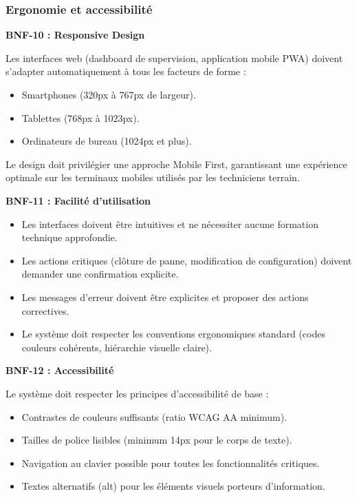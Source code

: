 \subsubsection{Ergonomie et accessibilité}

\textbf{BNF-10 : Responsive Design}

Les interfaces web (dashboard de supervision, application mobile PWA) doivent s'adapter automatiquement à tous les facteurs de forme :

\begin{itemize}
    \item Smartphones (320px à 767px de largeur).
    \item Tablettes (768px à 1023px).
    \item Ordinateurs de bureau (1024px et plus).
\end{itemize}

Le design doit privilégier une approche Mobile First, garantissant une expérience optimale sur les terminaux mobiles utilisés par les techniciens terrain.

\textbf{BNF-11 : Facilité d'utilisation}

\begin{itemize}
    \item Les interfaces doivent être intuitives et ne nécessiter aucune formation technique approfondie.
    \item Les actions critiques (clôture de panne, modification de configuration) doivent demander une confirmation explicite.
    \item Les messages d'erreur doivent être explicites et proposer des actions correctives.
    \item Le système doit respecter les conventions ergonomiques standard (codes couleurs cohérents, hiérarchie visuelle claire).
\end{itemize}

\textbf{BNF-12 : Accessibilité}

Le système doit respecter les principes d'accessibilité de base :

\begin{itemize}
    \item Contrastes de couleurs suffisants (ratio WCAG AA minimum).
    \item Tailles de police lisibles (minimum 14px pour le corps de texte).
    \item Navigation au clavier possible pour toutes les fonctionnalités critiques.
    \item Textes alternatifs (alt) pour les éléments visuels porteurs d'information.
\end{itemize}

